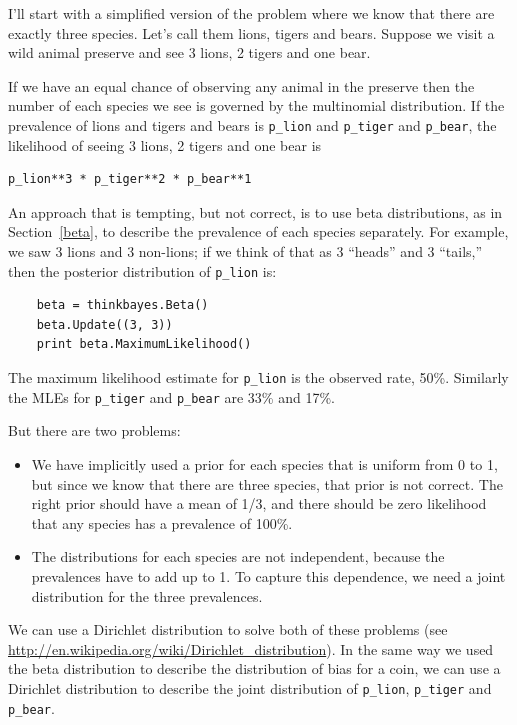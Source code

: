 \documentclass[12pt]{book}
\begin{document}
I'll start with a simplified version of the problem where we know that
there are exactly three species.  Let's call them lions, tigers and
bears.  Suppose we visit a wild animal preserve and see 3 lions, 2
tigers and one bear.

If we have an equal chance of observing any animal in the preserve
then the number of each species we see is governed by the multinomial
distribution.  If the prevalence of lions and tigers and bears is
\verb"p_lion" and \verb"p_tiger" and \verb"p_bear", the likelihood of
seeing 3 lions, 2 tigers and one bear is

\begin{verbatim}
p_lion**3 * p_tiger**2 * p_bear**1
\end{verbatim}

An approach that is tempting, but not correct, is to use beta
distributions, as in Section~\ref{beta}, to describe the prevalence of
each species separately.  For example, we saw 3 lions and 3 non-lions;
if we think of that as 3 ``heads'' and 3 ``tails,'' then the posterior
distribution of \verb"p_lion" is:

\begin{verbatim}
    beta = thinkbayes.Beta()
    beta.Update((3, 3))
    print beta.MaximumLikelihood()
\end{verbatim}

The maximum likelihood estimate for \verb"p_lion" is the observed
rate, 50\%.  Similarly the MLEs for \verb"p_tiger" and \verb"p_bear"
are 33\% and 17\%.

But there are two problems:

\begin{itemize}

\item We have implicitly used a prior for each species that is uniform
  from 0 to 1, but since we know that there are three species, that
  prior is not correct.  The right prior should have a mean of 1/3,
  and there should be zero likelihood that any species has a
  prevalence of 100\%.

\item The distributions for each species are not independent, because
  the prevalences have to add up to 1.  To capture this dependence, we
  need a joint distribution for the three prevalences.

\end{itemize}

We can use a Dirichlet distribution to solve both of these problems
(see \url{http://en.wikipedia.org/wiki/Dirichlet_distribution}).  In
the same way we used the beta distribution to describe the
distribution of bias for a coin, we can use a Dirichlet
distribution to describe the joint distribution of \verb"p_lion",
\verb"p_tiger" and \verb"p_bear".
\end{document}
